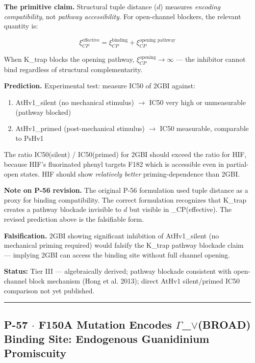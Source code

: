 \documentclass[12pt,a4paper]{article}
\begin{document}
\textbf{The primitive claim.} Structural tuple distance ($d$) measures \emph{encoding compatibility}, not \emph{pathway accessibility}. For open-channel blockers, the relevant quantity is:

\[\xi_{CP}^\text{effective} = \xi_{CP}^\text{binding} + \xi_{CP}^\text{opening pathway}\]

When K\_trap blocks the opening pathway, $\xi_{CP}^\text{opening} \to \infty$ --- the inhibitor cannot bind regardless of structural complementarity.

\textbf{Prediction.} Experimental test: measure IC50 of 2GBI against:

\begin{enumerate}
    \item AtHv1\_silent (no mechanical stimulus) $\rightarrow$ IC50 very high or unmeasurable (pathway blocked)
    \item AtHv1\_primed (post-mechanical stimulus) $\rightarrow$ IC50 measurable, comparable to PsHv1
\end{enumerate}

The ratio IC50(silent) / IC50(primed) for 2GBI should exceed the ratio for HIF, because HIF's fluorinated phenyl targets F182 which is accessible even in partial-open states. HIF should show \emph{relatively better} priming-dependence than 2GBI.

\textbf{Note on P-56 revision.} The original P-56 formulation used tuple distance as a proxy for binding compatibility. The correct formulation recognizes that K\_trap creates a pathway blockade invisible to $d$ but visible in \xi\_CP(effective). The revised prediction above is the falsifiable form.

\textbf{Falsification.} 2GBI showing significant inhibition of AtHv1\_silent (no mechanical priming required) would falsify the K\_trap pathway blockade claim --- implying 2GBI can access the binding site without full channel opening.

\textbf{Status:} Tier III --- algebraically derived; pathway blockade consistent with open-channel block mechanism (Hong et al. 2013); direct AtHv1 silent/primed IC50 comparison not yet published.

\begin{center}
\rule{0.5\textwidth}{0.4pt}
\end{center}

\subsection{P-57 $\cdot$ F150A Mutation Encodes $\Gamma$\_$\lor$(BROAD) Binding Site: Endogenous Guanidinium Promiscuity}
\end{document}
